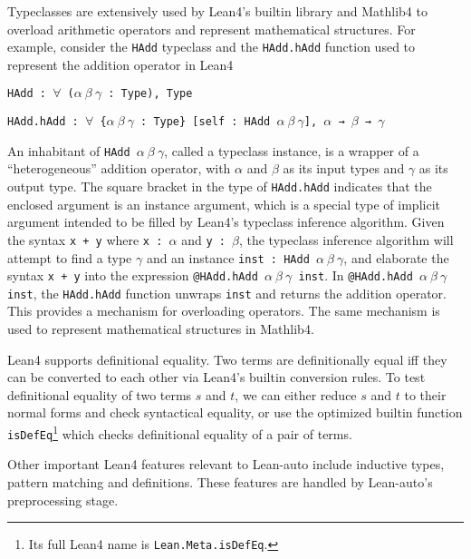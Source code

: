   Typeclasses are extensively used by Lean4's builtin library and Mathlib4 to
  overload arithmetic operators and represent mathematical structures. For example,
  consider the \texttt{HAdd} typeclass and the \texttt{HAdd.hAdd} function
  used to represent the addition operator in Lean4
  
  \centerline{\texttt{HAdd : $\forall$ ($\alpha \ \beta \ \gamma$ : Type), Type}}
  \centerline{\texttt{HAdd.hAdd : $\forall$ \{$\alpha \ \beta \ \gamma$ : Type\} [self : HAdd $\alpha \ \beta \ \gamma$], $\alpha$ → $\beta$ → $\gamma$}}

  \noindent An inhabitant of \texttt{HAdd $\alpha \ \beta \ \gamma$}, called a
  typeclass instance, is a wrapper of a ``heterogeneous'' addition operator, with $\alpha$ and $\beta$ as its input types and
  $\gamma$ as its output type. The square bracket in the type of \texttt{HAdd.hAdd}
  indicates that the enclosed argument is an instance argument, which is a special type
  of implicit argument intended to be filled by Lean4's typeclass inference algorithm.
  Given the syntax \texttt{x + y} where \texttt{x : $\alpha$} and \texttt{y : $\beta$},
  the typeclass inference algorithm will attempt to find a type $\gamma$ and
  an instance \texttt{inst : HAdd $\alpha \ \beta \ \gamma$}, and elaborate the
  syntax \texttt{x + y} into the expression \texttt{@HAdd.hAdd $\alpha \ \beta \ \gamma$ inst}.
  In \texttt{@HAdd.hAdd $\alpha \ \beta \ \gamma$ inst}, the \texttt{HAdd.hAdd} function
  unwraps \texttt{inst} and returns the addition operator. This provides a mechanism
  for overloading operators. The same mechanism is used to represent mathematical
  structures in Mathlib4.

  Lean4 supports definitional equality. Two terms are definitionally equal
  iff they can be converted to each other via Lean4's builtin conversion rules.
  To test definitional equality of two terms $s$ and $t$, we can either reduce $s$ and
  $t$ to their normal forms and check syntactical equality, or use the optimized
  builtin function \texttt{isDefEq}\footnote{Its full Lean4 name is \texttt{Lean.Meta.isDefEq}.}
  which checks definitional equality of a pair of terms.

  Other important Lean4 features relevant to Lean-auto include inductive types, pattern matching and definitions.
  These features are handled by Lean-auto's preprocessing stage.
